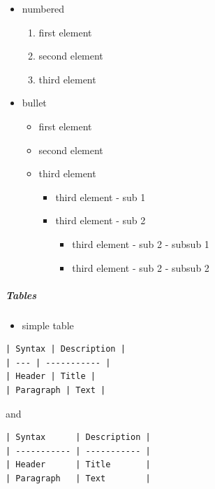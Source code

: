 \documentclass[
]{article}
\providecommand{\tightlist}{%
  \setlength{\itemsep}{0pt}\setlength{\parskip}{0pt}}
\begin{document}
\begin{itemize}
\item
  numbered

  \begin{enumerate}
  \def\labelenumi{\arabic{enumi}.}
  \tightlist
  \item
    first element
  \item
    second element
  \item
    third element
  \end{enumerate}
\item
  bullet

  \begin{itemize}
  \tightlist
  \item
    first element
  \item
    second element
  \item
    third element

    \begin{itemize}
    \tightlist
    \item
      third element - sub 1
    \item
      third element - sub 2

      \begin{itemize}
      \tightlist
      \item
        third element - sub 2 - subsub 1
      \item
        third element - sub 2 - subsub 2
      \end{itemize}
    \end{itemize}
  \end{itemize}
\end{itemize}

\hypertarget{tables}{%
\subparagraph{Tables}\label{tables}}

\begin{itemize}
\tightlist
\item
  simple table
\end{itemize}

\begin{verbatim}
| Syntax | Description |
| --- | ----------- |
| Header | Title |
| Paragraph | Text |
\end{verbatim}

and

\begin{verbatim}
| Syntax      | Description |
| ----------- | ----------- |
| Header      | Title       |
| Paragraph   | Text        |
\end{verbatim}
\end{document}
